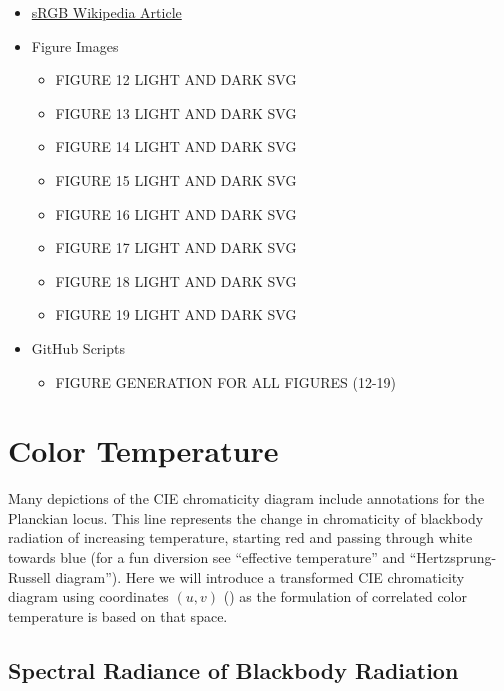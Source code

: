\documentclass{article}
\begin{document}
\begin{multicols}{2}
\begin{itemize}
    \item \href{https://en.wikipedia.org/wiki/SRGB}{sRGB Wikipedia Article}
    \item Figure Images
    \begin{itemize}
        \item FIGURE 12 LIGHT AND DARK SVG
        \item FIGURE 13 LIGHT AND DARK SVG
        \item FIGURE 14 LIGHT AND DARK SVG
        \item FIGURE 15 LIGHT AND DARK SVG
        \item FIGURE 16 LIGHT AND DARK SVG
        \item FIGURE 17 LIGHT AND DARK SVG
        \item FIGURE 18 LIGHT AND DARK SVG
        \item FIGURE 19 LIGHT AND DARK SVG
    \end{itemize}
    \item GitHub Scripts
    \begin{itemize}
        \item FIGURE GENERATION FOR ALL FIGURES (12-19)
    \end{itemize}
\end{itemize}

\end{multicols}

\iffalse


\section{Color Temperature} \label{sec:color_temperature}

Many depictions of the CIE chromaticity diagram include annotations for the Planckian locus.  This line represents the change in chromaticity of blackbody radiation of increasing temperature, starting red and passing through white towards blue (for a fun diversion see “effective temperature” and “Hertzsprung-Russell diagram”).  Here we will introduce a transformed CIE chromaticity diagram using coordinates $(u,v)$ (\cite{cie_1960}) as the formulation of correlated color temperature is based on that space.

\subsection{Spectral Radiance of Blackbody Radiation} %
\end{document}

